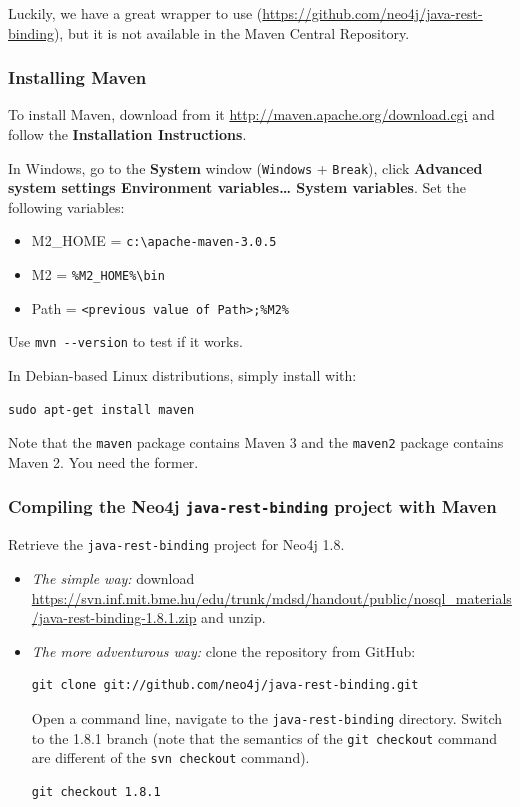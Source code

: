 \documentclass[]{report}
\begin{document}
Luckily, we have a great wrapper to use
(\url{https://github.com/neo4j/java-rest-binding}), but it is not
available in the Maven Central Repository.

\subsubsection{Installing Maven}

To install Maven, download from it
\url{http://maven.apache.org/download.cgi} and follow the
\textbf{Installation Instructions}.

In Windows, go to the \textbf{System} window (\texttt{Windows} +
\texttt{Break}), click \textbf{Advanced system settings \textbar{}
Environment variables\ldots{} \textbar{} System variables}. Set the
following variables:

\begin{itemize}
\itemsep1pt\parskip0pt
\item
  M2\_HOME = \texttt{c:\textbackslash{}apache-maven-3.0.5}
\item
  M2 = \texttt{\%M2\_HOME\%\textbackslash{}bin}
\item
  Path = \texttt{\textless{}previous value of Path\textgreater{};\%M2\%}
\end{itemize}

Use \texttt{mvn -{}-version} to test if it works.

In Debian-based Linux distributions, simply install with:

\begin{verbatim}
sudo apt-get install maven
\end{verbatim}

Note that the \texttt{maven} package contains Maven 3 and the
\texttt{maven2} package contains Maven 2. You need the former.

\subsubsection{Compiling the Neo4j \texttt{java-rest-binding} project
with Maven}

Retrieve the \texttt{java-rest-binding} project for Neo4j 1.8.

\begin{itemize}
\item
  \emph{The simple way:} download
  \url{https://svn.inf.mit.bme.hu/edu/trunk/mdsd/handout/public/nosql_materials/java-rest-binding-1.8.1.zip}
  and unzip.
\item
  \emph{The more adventurous way:} clone the repository from GitHub:

\begin{verbatim}
git clone git://github.com/neo4j/java-rest-binding.git
\end{verbatim}

  Open a command line, navigate to the \texttt{java-rest-binding}
  directory. Switch to the 1.8.1 branch (note that the semantics of the
  \texttt{git checkout} command are different of the
  \texttt{svn checkout} command).

\begin{verbatim}
git checkout 1.8.1 
\end{verbatim}
\end{itemize}
\end{document}

